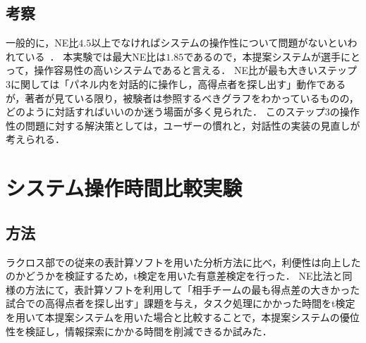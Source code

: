 \documentclass[sotsuron]{kuee}
\begin{document}
		\subsection{考察}
			一般的に，NE比$4.5$以上でなければシステムの操作性について問題がないといわれている~\cite{NEMratio}．
			本実験では最大NE比は$1.85$であるので，本提案システムが選手にとって，操作容易性の高いシステムであると言える．
			NE比が最も大きいステップ3に関しては「パネル内を対話的に操作し，高得点者を探し出す」動作であるが，著者が見ている限り，被験者は参照するべきグラフをわかっているものの，どのように対話すればいいのか迷う場面が多く見られた．
			このステップ3の操作性の問題に対する解決策としては，ユーザーの慣れと，対話性の実装の見直しが考えられる．
	\section{システム操作時間比較実験}
		\subsection{方法}
			ラクロス部での従来の表計算ソフトを用いた分析方法に比べ，利便性は向上したのかどうかを検証するため，t検定を用いた有意差検定を行った．
			NE比法と同様の方法にて，表計算ソフトを利用して「相手チームの最も得点差の大きかった試合での高得点者を探し出す」課題を与え，タスク処理にかかった時間をt検定を用いて本提案システムを用いた場合と比較することで，本提案システムの優位性を検証し，情報探索にかかる時間を削減できるか試みた．
\end{document}
